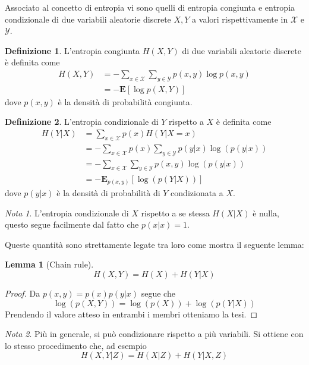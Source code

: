 \documentclass[a4paper,11pt]{book}
\theoremstyle{plain}
\newtheorem{lemma}[teo]{Lemma}
\theoremstyle{definition}
\newtheorem{defn}{Definizione}[chapter]
\theoremstyle{remark}
\newtheorem*{nota}{Nota}
\begin{document}
Associato al concetto di entropia vi sono quelli di entropia congiunta e entropia condizionale di due variabili aleatorie discrete $X,Y$ a valori rispettivamente in $\mathcal{X}$ e $\mathcal{Y}$.
\begin{defn}
	L'entropia congiunta $H(X,Y)$ di due variabili aleatorie discrete è definita come
	\begin{equation*}
	\begin{split}	
		H(X,Y) & = -\sum_{x\in \mathcal{X}}\sum_{y\in \mathcal{Y}}{p(x,y)\log p(x,y) }\\
		 & = -\mathbf{E}[\log p(X,Y)]
	\end{split}
	\end{equation*}
	dove $p(x,y)$ è la densità di probabilità congiunta.
\end{defn}
\begin{defn}
	L'entropia condizionale di $Y$ rispetto a $X$ è definita come
	\begin{equation*}
	\begin{split}
		H(Y|X) & =\sum_{x\in \mathcal{X}}{p(x)H(Y|X = x)} \\
		& = -\sum_{x\in \mathcal{X}}p(x)\sum_{y\in \mathcal{Y}}{p(y|x)\log(p(y|x))}\\
		& = -\sum_{x\in \mathcal{X}}\sum_{y\in \mathcal{Y}}{p(x,y)\log(p(y|x))}\\
		& = -\mathbf{E}_{p(x,y)}[\log(p(Y|X))]
		\end{split}
	\end{equation*}
	dove $p(y|x)$ è la densità di probabilità di $Y$ condizionata a $X$.
\end{defn}
\begin{nota}
	L'entropia condizionale di $X$ rispetto a se stessa $H(X|X)$ è nulla, questo segue facilmente dal fatto che $p(x|x) = 1$.
\end{nota}

Queste quantità sono strettamente legate tra loro come mostra il seguente lemma:
\begin{lemma}[Chain rule]\label{entr:chain-rule}
	\begin{equation*}
		H(X,Y) = H(X)+H(Y|X)
	\end{equation*}
\end{lemma}
\begin{proof}
	Da $p(x,y) = p(x)p(y|x)$ segue che 
	\begin{equation*}
	\log(p(X,Y)) = \log(p(X)) + \log(p(Y|X))
	\end{equation*} Prendendo il valore atteso in entrambi i membri otteniamo la tesi.
\end{proof}
\begin{nota}
	Più in generale, si può condizionare rispetto a più variabili. Si ottiene con lo stesso procedimento che, ad esempio
	\begin{equation*}
		H(X,Y|Z) = H(X|Z)+H(Y|X,Z)
	\end{equation*}
\end{nota}
\end{document}
